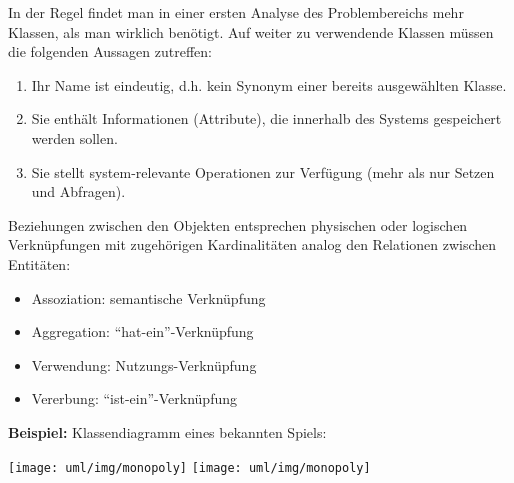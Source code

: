 \begin{minipage}[c]{0.45\linewidth}
In der Regel findet man in einer ersten Analyse des Problembereichs
mehr Klassen, als man wirklich ben\"otigt. Auf weiter zu verwendende Klassen
m\"ussen die folgenden Aussagen zutreffen:
\begin{enumerate}
\item Ihr Name ist eindeutig, d.h. kein Synonym einer bereits
 ausgew\"ahlten Klasse.
\item Sie enth\"alt Informationen (Attribute), die innerhalb
  des Systems gespeichert werden sollen.
\item Sie stellt system-relevante Operationen zur Verf\"ugung (mehr als
   nur Setzen und Abfragen).
\end{enumerate}
Beziehungen zwischen den Objekten entsprechen physischen oder
logischen Verkn\"upfungen mit zugeh\"origen Kardinalit\"aten
analog den Relationen zwischen Entit\"aten:
\begin{itemize}
\item Assoziation: semantische Verkn\"upfung
\item Aggregation: ``hat-ein''-Verkn\"upfung
\item Verwendung: Nutzungs-Verkn\"upfung
\item Vererbung: ``ist-ein''-Verkn\"upfung
\end{itemize}
\newpage
{\bfseries Beispiel:} Klassendiagramm eines bekannten Spiels:\\[1.5ex]
\begin{center}
\ifslides
\texttt{[image: uml/img/monopoly]}
\else
\texttt{[image: uml/img/monopoly]}

\end{center}
\end{minipage}
